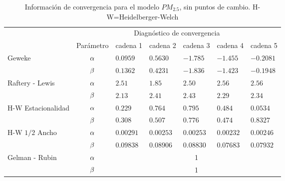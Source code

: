 \begin{table}[!h]
\centering
\begin{tabular}{|l|c|l|l|l|l|l|}
\hline
& \multicolumn{6}{|c|}{Diagnóstico de convergencia} \\
\cline{2-7}
& Parámetro & cadena 1  & cadena 2  & cadena 3 & cadena 4 & cadena 5	 \\
\hline \hline
\multirow{2}{2.5cm}{Geweke} & $\alpha$ & $0.0959$ & $0.5630$ & $-1.785$ & $-1.455$  & $ -0.2081$\\ \cline{2-7}
& $\beta$& $0.1362$ & $0.4231$ & $-1.836$ & $-1.423 $ & $-0.1948$\\
  \cline{1-7}
\multirow{2}{2.5cm}{Raftery - Lewis} & $\alpha$ & $2.51 $& $  1.85$ & $2.50$ & $2.56  $ & $  2.56  $\\ \cline{2-7}
& $\beta$ & \multicolumn{1}{l|}{$ 2.13$} & $2.41$ & $2.43$ & $2.29	 $ & $2.34  $ \\ \cline{1-7}
\multirow{2}{2.5cm}{H-W Estacionalidad} & $\alpha$ & $0.229  $ & $0.764 $ & $0.795$ & $0.484$ & $0.0534$ \\ \cline{2-7}
&$\beta$ & \multicolumn{1}{l|}{$0.308 $} & $  0.507$ &  $ 0.776 $ & $ 0.474$ & $ 0.8327 $ \\ \cline{1-7}
\multirow{2}{2.5cm}{H-W $1/2$ Ancho} & $\alpha$ & $0.00291$ & $0.00253$ & $0.00253$ & $0.00232 $  & $0.00246 $  \\ \cline{2-7}
&$\beta$ & \multicolumn{1}{l|}{$0.09838  $} & $0.08906$ & $0.08830 $ & $ 0.07683$ & $0.07932 $ \\ \cline{1-7}

\multirow{2}{2.5cm}{Gelman - Rubin} & $\alpha$ & \multicolumn{5}{|c|}{1}\\ \cline{2-7}
&$\beta$ &  \multicolumn{5}{|c|}{1} \\ \cline{1-7}



\end{tabular}
\caption{Información de convergencia para el modelo $PM_{2.5}$, sin puntos de cambio. H-W=Heidelberger-Welch}

\label{converpm25spc}
\end{table}





